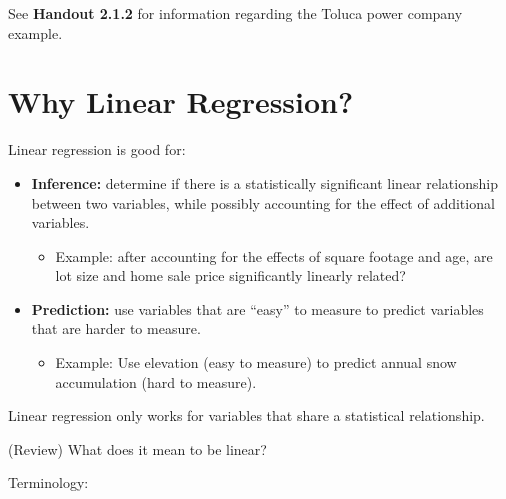 \documentclass[12pt]{notes}
\begin{document}

See \textbf{Handout 2.1.2} for information regarding the Toluca power company example.

\section{Why Linear Regression?}

\nspace
Linear regression is good for: 
\begin{itemize}
\item \textbf{Inference:} determine if there is a statistically significant linear relationship between two variables, while possibly accounting for the effect of additional variables. 
\begin{itemize}
\item Example: after accounting for the effects of square footage and age, are lot size and home sale price significantly linearly related?  
\end{itemize} 
\item \textbf{Prediction:} use variables that are ``easy'' to measure to predict variables that are harder to measure.  
\begin{itemize}
\item Example: Use elevation (easy to measure) to predict annual snow accumulation (hard to measure). 
\end{itemize} 
\end{itemize}

\nspace
Linear regression only works for variables that share a statistical relationship.

\nspace
{}

\begin{minipage}[l][3cm][c]{\textwidth}

\nspace
{}
\end{minipage}

\nspace
(Review) What does it mean to be linear?

\nspace
\note{\[Y = \beta_0 + \sum_i\beta_if(X_i)\]}

\nspace
Terminology: 
\end{document}
